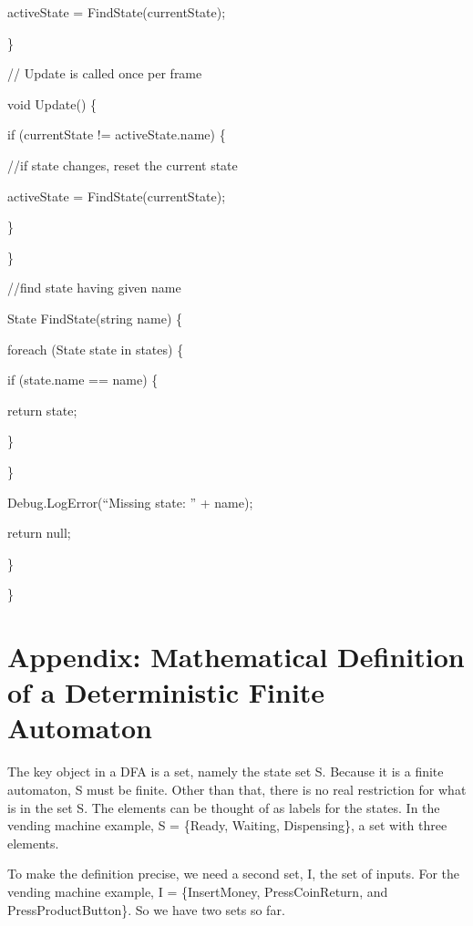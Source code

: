 activeState = FindState(currentState);

\}

// Update is called once per frame

void Update() \{

if (currentState != activeState.name) \{

//if state changes, reset the current state

activeState = FindState(currentState);

\}

\}

//find state having given name

State FindState(string name) \{

foreach (State state in states) \{

if (state.name == name) \{

return state;

\}

\}

Debug.LogError(``Missing state: '' + name);

return null;

\}

\}

\section[Appendix: Mathematical Definition of a Deterministic Finite
Automaton]{\texorpdfstring{\protect\hypertarget{anchor-22}{}{}Appendix:
Mathematical Definition of a Deterministic Finite
Automaton}{Appendix: Mathematical Definition of a Deterministic Finite Automaton}}\label{appendix-mathematical-definition-of-a-deterministic-finite-automaton}

The key object in a DFA is a set, namely the state set S. Because it is
a finite automaton, S must be finite. Other than that, there is no real
restriction for what is in the set S. The elements can be thought of as
labels for the states. In the vending machine example, S = \{Ready,
Waiting, Dispensing\}, a set with three elements.

To make the definition precise, we need a second set, I, the set of
inputs. For the vending machine example, I = \{InsertMoney,
PressCoinReturn, and PressProductButton\}. So we have two sets so far.

